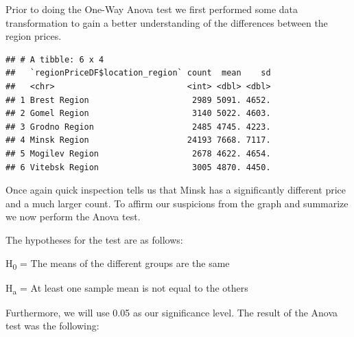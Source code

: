 \documentclass[
]{article}
\newenvironment{Shaded}{\begin{snugshade}}{\end{snugshade}}
\newcommand{\AttributeTok}[1]{\textcolor[rgb]{0.77,0.63,0.00}{#1}}
\newcommand{\CommentTok}[1]{\textcolor[rgb]{0.56,0.35,0.01}{\textit{#1}}}
\newcommand{\ConstantTok}[1]{\textcolor[rgb]{0.00,0.00,0.00}{#1}}
\newcommand{\FunctionTok}[1]{\textcolor[rgb]{0.00,0.00,0.00}{#1}}
\newcommand{\NormalTok}[1]{#1}
\newcommand{\OtherTok}[1]{\textcolor[rgb]{0.56,0.35,0.01}{#1}}
\newcommand{\SpecialCharTok}[1]{\textcolor[rgb]{0.00,0.00,0.00}{#1}}
\begin{document}
Prior to doing the One-Way Anova test we first performed some data
transformation to gain a better understanding of the differences between
the region prices.

\begin{Shaded}
\end{Shaded}

\begin{verbatim}
## # A tibble: 6 x 4
##   `regionPriceDF$location_region` count  mean    sd
##   <chr>                           <int> <dbl> <dbl>
## 1 Brest Region                     2989 5091. 4652.
## 2 Gomel Region                     3140 5022. 4603.
## 3 Grodno Region                    2485 4745. 4223.
## 4 Minsk Region                    24193 7668. 7117.
## 5 Mogilev Region                   2678 4622. 4654.
## 6 Vitebsk Region                   3005 4870. 4450.
\end{verbatim}

Once again quick inspection tells us that Minsk has a significantly
different price and a much larger count. To affirm our suspicions from
the graph and summarize we now perform the Anova test.

The hypotheses for the test are as follows:

H\textsubscript{0} = The means of the different groups are the same

H\textsubscript{a} = At least one sample mean is not equal to the others

Furthermore, we will use 0.05 as our significance level. The result of
the Anova test was the following:

\begin{Shaded}
\end{Shaded}
\end{document}
